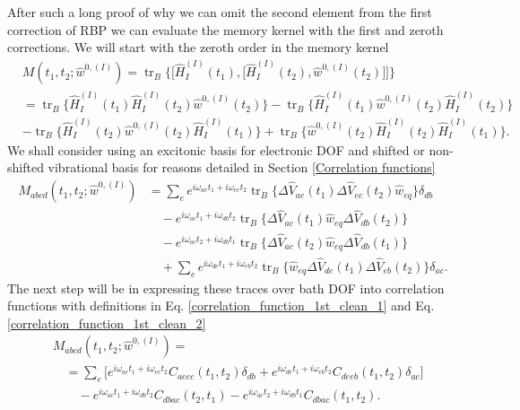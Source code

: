 
After such a long proof of why we can omit the second element from the first correction of RBP we can evaluate the memory kernel with the first and zeroth corrections. We will start with the zeroth order in the memory kernel
\begin{equation}
    \begin{aligned}
    &M(t_1, t_2; \hat{w}^{0,(I)}) = \operatorname{tr}_B \Big\{ \Big[\hat{H}_{I}^{(I)}(t_1), \Big[\hat{H}_{I}^{(I)}(t_2), \hat{w}^{0,(I)}(t_2)\Big]\Big]\Big\} \\
    &= \operatorname{tr}_B \Big\{ \hat{H}_{I}^{(I)}(t_1)\hat{H}_{I}^{(I)}(t_2) \hat{w}^{0,(I)}(t_2)\Big\} - \operatorname{tr}_B \Big\{ \hat{H}_{I}^{(I)}(t_1) \hat{w}^{0,(I)}(t_2) \hat{H}_{I}^{(I)}(t_2)\Big\} \\
    &- \operatorname{tr}_B \Big\{ \hat{H}_{I}^{(I)}(t_2) \hat{w}^{0,(I)}(t_2) \hat{H}_{I}^{(I)}(t_1)\Big\} + \operatorname{tr}_B \Big\{ \hat{w}^{0,(I)}(t_2) \hat{H}_{I}^{(I)}(t_2) \hat{H}_{I}^{(I)}(t_1) \Big\}.
    \end{aligned}
\end{equation}
We shall consider using an excitonic basis for electronic DOF and shifted or non-shifted vibrational basis for reasons detailed in Section \ref{Correlation functions}
\begin{equation}
\label{MF_w_0_1}
    \begin{aligned}
    M_{abcd}(t_1, t_2; \hat{w}^{0,(I)}) &= \sum_{e} e^{i\omega_{ae}t_1 + i\omega_{ec}t_2} \operatorname{tr}_B \Big\{ \Delta\hat{V}_{ae}(t_1) \Delta\hat{V}_{ec}(t_2) \hat{w}_{eq} \Big\}\delta_{db} \\
    & \quad - e^{i\omega_{ac}t_1 + i\omega_{db}t_2} \operatorname{tr}_B \Big\{ \Delta\hat{V}_{ac}(t_1) \hat{w}_{eq} \Delta\hat{V}_{db}(t_2) \Big\} \\
    &\quad - e^{i\omega_{ac}t_2 + i\omega_{db}t_1} \operatorname{tr}_B \Big\{ \Delta\hat{V}_{ac}(t_2) \hat{w}_{eq} \Delta\hat{V}_{db}(t_1) \Big\} \\
    & \quad + \sum_{e} e^{i\omega_{de}t_1 + i\omega_{eb}t_2} \operatorname{tr}_B \Big\{ \hat{w}_{eq} \Delta\hat{V}_{de}(t_1) \Delta\hat{V}_{eb}(t_2)  \Big\}\delta_{ac}.
    \end{aligned}
\end{equation}
The next step will be in expressing these traces over bath DOF into correlation functions with definitions in Eq. \ref{correlation_function_1st_clean_1} and Eq. \ref{correlation_function_1st_clean_2}
\begin{equation}
\label{MF_w_0_2}
    \begin{aligned}
    &M_{abcd}(t_1, t_2; \hat{w}^{0,(I)}) = \\
    &\quad=\sum_{e} \Big[ e^{i\omega_{ae}t_1 + i\omega_{ec}t_2} C_{aeec}(t_1, t_2) \delta_{db} +  e^{i\omega_{de}t_1 + i\omega_{eb}t_2} C_{deeb}(t_1, t_2)\delta_{ac} \Big] \\
    & \quad \quad - e^{i\omega_{ac}t_1 + i\omega_{db}t_2}C_{dbac}(t_2, t_1) - e^{i\omega_{ac}t_2 + i\omega_{db}t_1} C_{dbac}(t_1, t_2). \\
    \end{aligned}
\end{equation}
